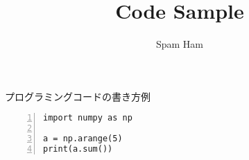 \documentclass[10pt]{jsarticle}
\begin{document}
	\title{Code Sample}
	\author{Spam Ham}
	\date{}	
	\maketitle
	

	プログラミングコードの書き方例
	\begin{lstlisting}[basicstyle=\ttfamily, frame=single,numbers=left]
import numpy as np

a = np.arange(5)
print(a.sum())
	\end{lstlisting}
	
\end{document}
